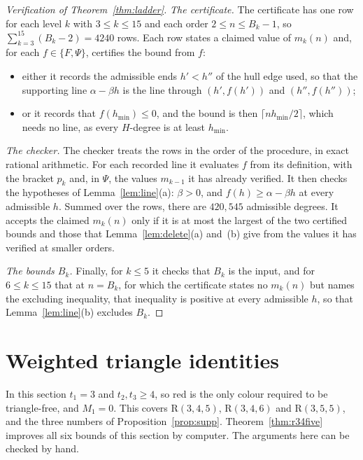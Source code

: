\documentclass[11pt]{article}
\theoremstyle{spacedplain}
\theoremstyle{spaceddef}
\theoremstyle{spacedremark}
\newcommand{\R}{\mathrm{R}}
\begin{document}
\begin{proof}[Verification of Theorem~\ref{thm:ladder}]
\emph{The certificate.}
The certificate has one row for each level $k$ with $3\le k\le 15$ and each order $2\le n\le B_k-1$, so $\sum_{k=3}^{15}(B_k-2)=4240$ rows.
Each row states a claimed value of $m_k(n)$ and, for each $f\in\{F,\Psi\}$, certifies the bound from $f$:
\begin{itemize}
\item either it records the admissible ends $h'<h''$ of the hull edge used, so that the supporting line $\alpha-\beta h$ is the line through $(h',f(h'))$ and $(h'',f(h''))$;
\item or it records that $f(h_{\min})\le 0$, and the bound is then $\lceil nh_{\min}/2\rceil$, which needs no line, as every $H$-degree is at least $h_{\min}$.
\end{itemize}

\emph{The checker.}
The checker treats the rows in the order of the procedure, in exact rational arithmetic.
For each recorded line it evaluates $f$ from its definition, with the bracket $p_k$ and, in $\Psi$, the values $m_{k-1}$ it has already verified.
It then checks the hypotheses of Lemma~\ref{lem:line}(a): $\beta>0$, and $f(h)\ge\alpha-\beta h$ at every admissible $h$.
Summed over the rows, there are $420{,}545$ admissible degrees.
It accepts the claimed $m_k(n)$ only if it is at most the largest of the two certified bounds and those that Lemma~\ref{lem:delete}(a) and~(b) give from the values it has verified at smaller orders.

\emph{The bounds $B_k$.}
Finally, for $k\le 5$ it checks that $B_k$ is the input, and for $6\le k\le 15$ that at $n=B_k$, for which the certificate states no $m_k(n)$ but names the excluding inequality, that inequality is positive at every admissible $h$, so that Lemma~\ref{lem:line}(b) excludes $B_k$.
\end{proof}

\section{Weighted triangle identities}\label{sec:types}

In this section $t_1=3$ and $t_2,t_3\ge 4$, so red is the only colour required to be triangle-free, and $M_1=0$.
This covers $\R(3,4,5)$, $\R(3,4,6)$ and $\R(3,5,5)$, and the three numbers of Proposition~\ref{prop:supp}.
Theorem~\ref{thm:r34five} improves all six bounds of this section by computer.
The arguments here can be checked by hand.
\end{document}
